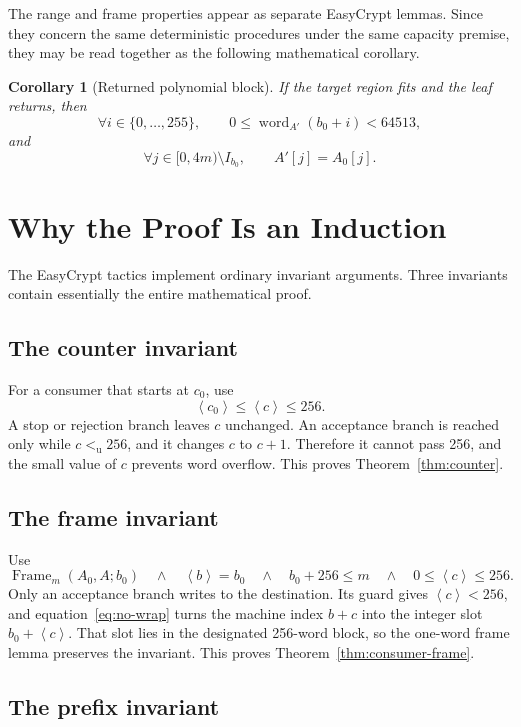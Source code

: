 \documentclass[11pt]{article}
\theoremstyle{definition}
\theoremstyle{plain}
\newtheorem{corollary}{Corollary}
\theoremstyle{remark}
\newcommand{\uint}[1]{\left\langle #1\right\rangle}
\newcommand{\word}[2]{\operatorname{word}_{#1}(#2)}
\newcommand{\Frame}{\operatorname{Frame}}
\begin{document}
The range and frame properties appear as separate EasyCrypt lemmas.  Since
they concern the same deterministic procedures under the same capacity
premise, they may be read together as the following mathematical corollary.

\begin{corollary}[Returned polynomial block]
\label{cor:combined}
If the target region fits and the leaf returns, then
\[
  \forall i\in\{0,\ldots,255\},\qquad
  0\le\word{A'}{b_0+i}<64513,
\]
and
\[
  \forall j\in[0,4m)\setminus I_{b_0},\qquad A'[j]=A_0[j].
\]
\end{corollary}

\section{Why the Proof Is an Induction}

The EasyCrypt tactics implement ordinary invariant arguments.  Three
invariants contain essentially the entire mathematical proof.

\subsection{The counter invariant}

For a consumer that starts at $c_0$, use
\[
  \uint{c_0}\le\uint{c}\le256.
\]
A stop or rejection branch leaves $c$ unchanged.  An acceptance branch is
reached only while $c<_{\mathrm u}256$, and it changes $c$ to $c+1$.
Therefore it cannot pass 256, and the small value of $c$ prevents word
overflow.  This proves Theorem~\ref{thm:counter}.

\subsection{The frame invariant}

Use
\[
  \Frame_m(A_0,A;b_0)
  \quad\land\quad
  \uint{b}=b_0
  \quad\land\quad
  b_0+256\le m
  \quad\land\quad
  0\le\uint{c}\le256.
\]
Only an acceptance branch writes to the destination.  Its guard gives
$\uint{c}<256$, and equation~\eqref{eq:no-wrap} turns the machine index
$b+c$ into the integer slot $b_0+\uint{c}$.  That slot lies in the designated
256-word block, so the one-word frame lemma preserves the invariant.  This
proves Theorem~\ref{thm:consumer-frame}.

\subsection{The prefix invariant}
\end{document}
